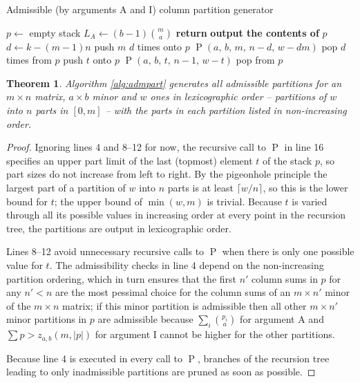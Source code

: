 \documentclass[10pt,a4paper]{article}
\newtheorem{theorem}{Theorem}[section]
\theoremstyle{definition}
\begin{document}
	\begin{algorithm}
		\caption{Admissible (by arguments A and I) column partition generator}\label{alg:admpart}
		\begin{algorithmic}[1]
			\State $p\gets$ empty stack 
			\State $L_A\gets(b-1)\binom ma$ 
			 
			\State \textbf{return}
			\State \textbf{output the contents of} $p$
			 
			\State $d\gets k-(m-1)n$
			\State push $m$ $d$ times onto $p$
			\State $\operatorname{P}(a,\,b,\,m,\,n-d,\,w-dm)$
			\State pop $d$ times from $p$
			\Else
			 
			\State push $t$ onto $p$
			\State $\operatorname{P}(a,\,b,\,t,\,n-1,\,w-t)$
			\State pop from $p$
			\EndFor
			\EndIf
			\EndProcedure
		\end{algorithmic}
	\end{algorithm}
	\begin{theorem}
		Algorithm \ref{alg:admpart} generates all admissible partitions for an $m\times n$ matrix, $a\times b$ minor and $w$ ones in lexicographic order -- partitions of $w$ into $n$ parts in $[0,m]$ -- with the parts in each partition listed in non-increasing order.
	\end{theorem}
	\begin{proof}
		Ignoring lines 4 and 8--12 for now, the recursive call to $\operatorname P$ in line 16 specifies an upper part limit of the last (topmost) element $t$ of the stack $p$, so part sizes do not increase from left to right. By the pigeonhole principle the largest part of a partition of $w$ into $n$ parts is at least $\lceil w/n\rceil$, so this is the lower bound for $t$; the upper bound of $\min(w,m)$ is trivial. Because $t$ is varied through all its possible values in increasing order at every point in the recursion tree, the partitions are output in lexicographic order.
		
		Lines 8--12 avoid unnecessary recursive calls to $\operatorname P$ when there is only one possible value for $t$. The admissibility checks in line 4 depend on the non-increasing partition ordering, which in turn ensures that the first $n'$ column sums in $p$ for any $n'<n$ are the most pessimal choice for the column sums of an $m\times n'$ minor of the $m\times n$ matrix; if this minor partition is admissible then all other $m\times n'$ minor partitions in $p$ are admissible because $\sum_i\binom{p_i}a$ for argument A and $\sum p>z_{a,b}(m,|p|)$ for argument I cannot be higher for the other partitions.
		
		Because line 4 is executed in every call to $\operatorname P$, branches of the recursion tree leading to only inadmissible partitions are pruned as soon as possible.
	\end{proof}
\end{document}
